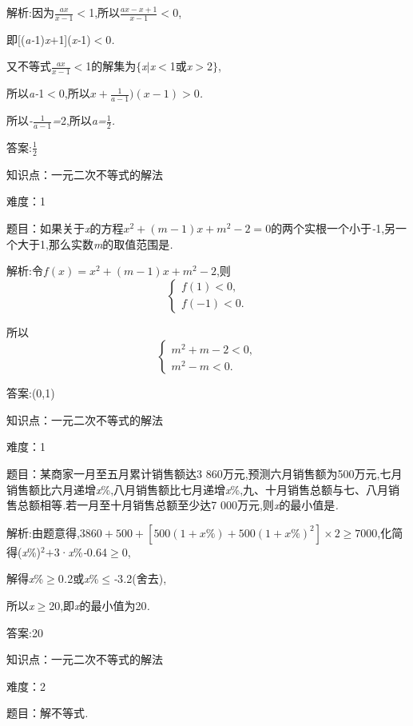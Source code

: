 \documentclass{article} %
\begin{document}
 解析:因为$\frac{ax}{x-1}$\textit{$<$}1,所以$\frac{ax-x+1}{x-1}$\textit{$<$}0,

即[(\textit{a-}1)\textit{x$+$}1](\textit{x-}1)\textit{$<$}0\textit{.}

又不等式$\frac{ax}{x-1}$\textit{$<$}1的解集为$\mathrm{\{}$\textit{x$|$x$<$}1或\textit{x$>$}2$\mathrm{\}}$,

所以\textit{a-}1\textit{$<$}0,所以$x+\frac{1}{a-1})(x-1)>0$\textit{.}

所以\textit{-}$\frac{1}{a-1}$\textit{=}2,所以\textit{a=}$\frac{1}{2}$\textit{.}

 答案:$\frac{1}{2}$

知识点：一元二次不等式的解法

难度：1

 题目：如果关于\textit{x}的方程$x^2+(m-1)x+m^2-2=0$的两个实根一个小于\textit{-}1,另一个大于1,那么实数\textit{m}的取值范围是\textit{\underbar{　　　　　}.~}

 解析:令$f(x)=x^2+(m-1)x+m^2-2$,则
\[
\begin{cases}
f(1)<0,\\
f(-1)<0.
\end{cases}
\]


所以
\[
\begin{cases}
m^2+m-2<0,\\
m^2-m<0.
\end{cases}
\]

 答案:(0,1)

知识点：一元二次不等式的解法

难度：1

 题目：某商家一月至五月累计销售额达3 860万元,预测六月销售额为500万元,七月销售额比六月递增\textit{x}\%,八月销售额比七月递增\textit{x}\%,九、十月销售总额与七、八月销售总额相等\textit{.}若一月至十月销售总额至少达7 000万元,则\textit{x}的最小值是\textit{\underbar{　　　　　}.~}

 解析:由题意得,$3860+500+[500(1+x\%)+500{(1+x\%)}^2] \times 2 \ge 7000$,化简得(\textit{x}\%)${}^{2}$\textit{$+$}3·\textit{x}\%\textit{-}0\textit{.}64$\mathrm{\ge}$0,

解得\textit{x}\%$\mathrm{\ge}$0\textit{.}2或\textit{x}\%$\mathrm{\le}$\textit{-}3\textit{.}2(舍去),

所以\textit{x}$\mathrm{\ge}$20,即\textit{x}的最小值为20\textit{.}

 答案:20

知识点：一元二次不等式的解法

难度：2

 题目：解不等式\textit{.}
\end{document}
